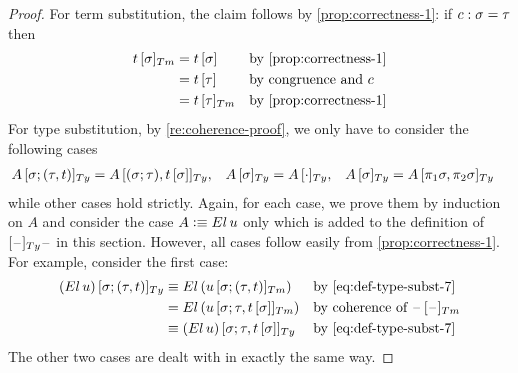 \documentclass[a4paper,UKenglish,numberwithinsect,cleveref,thm-restate]{lipics-v2021}
\begin{document}
\propCoherence*
\begin{proof}
  For term substitution, the claim follows by \cref{prop:correctness-1}: if
  $\cc : \sigma = \tau$ then
  \begin{align*}
    \subTm{t}{\sigma} & = \sub{t}{\sigma} && \text{by \cref{prop:correctness-1}} \\
                      & = \sub{t}{\tau} && \text{by congruence and $\cc$} \\
                      & = \subTm{t}{\tau} && \text{by \cref{prop:correctness-1}}
  \end{align*}
  For type substitution, by \cref{re:coherence-proof}, we only have to consider the following cases
  \begin{align*}
    \subTy{A}{\sigma; (\tau, t)}    & = \subTy{A}{(\sigma;\tau), \sub{t}{\sigma}},
                                     & \subTy{A}{\sigma}               & = \subTy{A}{\emptyctx},
                                     & \subTy{A}{\sigma}               & = \subTy{A}{\pi_1\sigma, \pi_2\sigma}
  \end{align*}
  while other cases hold strictly.
  Again, for each case, we prove them by induction on $A$ and consider the case $A \defeq \El\,u$ only which is added to the definition of $[\blank]_{\Ty}\blank$ in this section. 
  However, all cases follow easily from \cref{prop:correctness-1}.
  For example, consider the first case:
  \begin{align*}
    \subTy{(\El\,u)}{\sigma; (\tau, t)} & \judgeq \El\,(\subTm{u}{\sigma; (\tau, t)}) && \text{by \eqref{eq:def-type-subst-7}} \\
                                      & = \El\,( \subTm{u}{\sigma; \tau, \sub{t}{\sigma}}) && \text{by coherence of $\subTm{\blank}{\blank}$} \\
                                      & \judgeq \subTy{\left(\El\,u\right)}{\sigma; \tau, \sub{t}{\sigma}} && \text{by \eqref{eq:def-type-subst-7} }
  \end{align*}
  The other two cases are dealt with in exactly the same way.
\end{proof}
\end{document}
